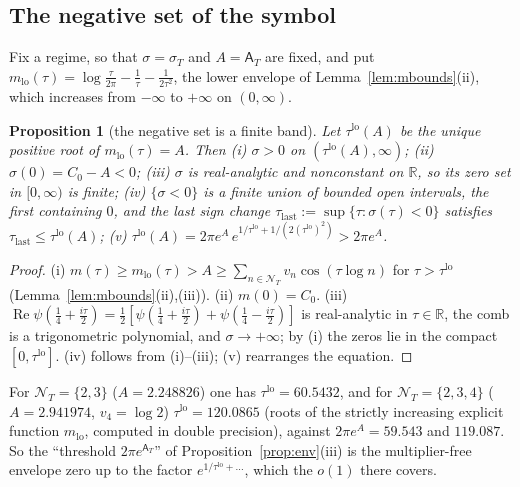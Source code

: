\documentclass[11pt]{amsart}
\newtheorem{proposition}[theorem]{Proposition}
\theoremstyle{definition}
\theoremstyle{remark}
\newcommand{\R}{\mathbb R}
\newcommand{\Rel}{\operatorname{Re}}
\newcommand{\sT}{\sigma_T}
\newcommand{\NT}{\mathcal N_T}
\newcommand{\Aconst}{\mathsf A_T}
\begin{document}
\subsection{The negative set of the symbol}\label{subsec:band}

Fix a regime, so that $\sigma=\sT$ and $A=\Aconst$ are fixed, and put
$m_{\mathrm{lo}}(\tau)=\log\frac\tau{2\pi}-\frac1\tau-\frac1{2\tau^2}$, the lower envelope of
Lemma~\ref{lem:mbounds}(ii), which increases from $-\infty$ to $+\infty$ on $(0,\infty)$.

\begin{proposition}[the negative set is a finite band]\label{prop:band}
Let $\tau^{\mathrm{lo}}(A)$ be the unique positive root of $m_{\mathrm{lo}}(\tau)=A$. Then \emph{(i)} $\sigma>0$ on
$(\tau^{\mathrm{lo}}(A),\infty)$; \emph{(ii)} $\sigma(0)=C_0-A<0$; \emph{(iii)} $\sigma$ is real-analytic and
nonconstant on $\R$, so its zero set in $[0,\infty)$ is finite; \emph{(iv)} $\{\sigma<0\}$ is a finite union of
bounded open intervals, the first containing $0$, and the last sign change
$\tau_{\mathrm{last}}:=\sup\{\tau:\sigma(\tau)<0\}$ satisfies $\tau_{\mathrm{last}}\le\tau^{\mathrm{lo}}(A)$;
\emph{(v)} $\tau^{\mathrm{lo}}(A)=2\pi e^A\,e^{1/\tau^{\mathrm{lo}}+1/(2(\tau^{\mathrm{lo}})^2)}>2\pi e^A$.
\end{proposition}
\begin{proof}
(i) $m(\tau)\ge m_{\mathrm{lo}}(\tau)>A\ge\sum_{n\in\NT}v_n\cos(\tau\log n)$ for $\tau>\tau^{\mathrm{lo}}$
(Lemma~\ref{lem:mbounds}(ii),(iii)). (ii) $m(0)=C_0$. (iii) $\Rel\psi(\frac14+\frac{i\tau}2)=\frac12[\psi(\frac14+\frac{i\tau}2)+\psi(\frac14-\frac{i\tau}2)]$
is real-analytic in $\tau\in\R$, the comb is a trigonometric polynomial, and $\sigma\to+\infty$; by (i) the
zeros lie in the compact $[0,\tau^{\mathrm{lo}}]$. (iv) follows from (i)--(iii); (v) rearranges the equation.
\end{proof}

For $\NT=\{2,3\}$ ($A=2.248826$) one has $\tau^{\mathrm{lo}}=60.5432$, and for $\NT=\{2,3,4\}$
($A=2.941974$, $v_4=\log2$) $\tau^{\mathrm{lo}}=120.0865$ (roots of the strictly increasing explicit
function $m_{\mathrm{lo}}$, computed in double precision), against $2\pi e^A=59.543$ and $119.087$. So the
``threshold $2\pi e^{\Aconst}$'' of Proposition~\ref{prop:env}(iii) is the multiplier-free envelope zero up
to the factor $e^{1/\tau^{\mathrm{lo}}+\dots}$, which the $o(1)$ there covers.
\end{document}
